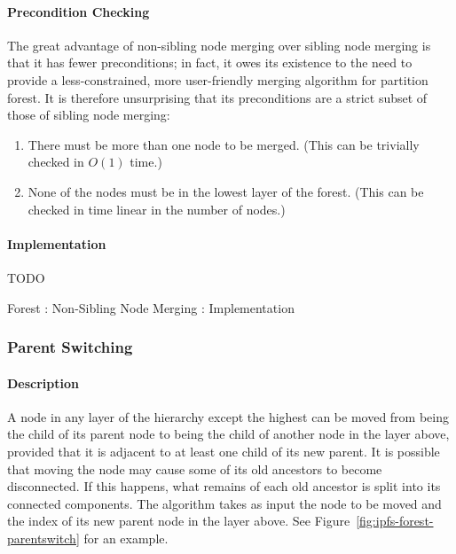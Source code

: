 \paragraph{Precondition Checking}

The great advantage of non-sibling node merging over sibling node merging is that it has fewer preconditions; in fact, it owes its existence to the need to provide a less-constrained, more user-friendly merging algorithm for partition forest. It is therefore unsurprising that its preconditions are a strict subset of those of sibling node merging:

\begin{enumerate}

\item There must be more than one node to be merged. (This can be trivially checked in $O(1)$ time.)
\item None of the nodes must be in the lowest layer of the forest. (This can be checked in time linear in the number of nodes.)

\end{enumerate}

\paragraph{Implementation}

TODO

\begin{stulisting}[p]
\caption{Forest : Non-Sibling Node Merging : Implementation}
\label{code:ipfs-forest-mergenonsiblingnodes}

\end{stulisting}

\afterpage{\clearpage}
\newpage

\subsubsection{Parent Switching}

\paragraph{Description}

A node in any layer of the hierarchy except the highest can be moved from being the child of its parent node to being the child of another node in the layer above, provided that it is adjacent to at least one child of its new parent. It is possible that moving the node may cause some of its old ancestors to become disconnected. If this happens, what remains of each old ancestor is split into its connected components. The algorithm takes as input the node to be moved and the index of its new parent node in the layer above. See Figure~\ref{fig:ipfs-forest-parentswitch} for an example.

